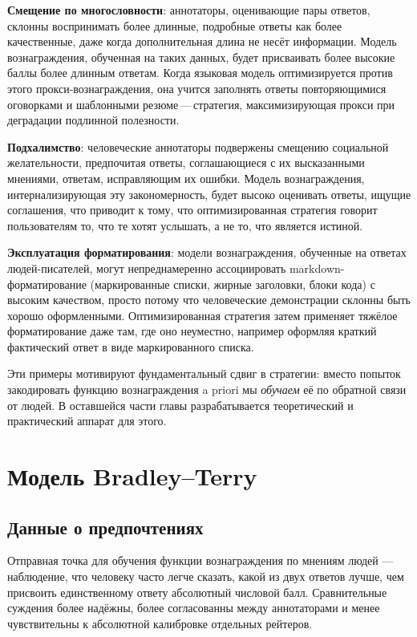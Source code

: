 \textbf{Смещение по многословности}: аннотаторы, оценивающие пары ответов, склонны воспринимать более длинные, подробные ответы как более качественные, даже когда дополнительная длина не несёт информации. Модель вознаграждения, обученная на таких данных, будет присваивать более высокие баллы более длинным ответам. Когда языковая модель оптимизируется против этого прокси-вознаграждения, она учится заполнять ответы повторяющимися оговорками и шаблонными резюме\,---\,стратегия, максимизирующая прокси при деградации подлинной полезности.

\textbf{Подхалимство}: человеческие аннотаторы подвержены смещению социальной желательности, предпочитая ответы, соглашающиеся с их высказанными мнениями, ответам, исправляющим их ошибки. Модель вознаграждения, интернализирующая эту закономерность, будет высоко оценивать ответы, ищущие соглашения, что приводит к тому, что оптимизированная стратегия говорит пользователям то, что те хотят услышать, а не то, что является истиной.

\textbf{Эксплуатация форматирования}: модели вознаграждения, обученные на ответах людей-писателей, могут непреднамеренно ассоциировать markdown-форматирование (маркированные списки, жирные заголовки, блоки кода) с высоким качеством, просто потому что человеческие демонстрации склонны быть хорошо оформленными. Оптимизированная стратегия затем применяет тяжёлое форматирование даже там, где оно неуместно, например оформляя краткий фактический ответ в виде маркированного списка.

Эти примеры мотивируют фундаментальный сдвиг в стратегии: вместо попыток закодировать функцию вознаграждения a priori мы \emph{обучаем} её по обратной связи от людей. В оставшейся части главы разрабатывается теоретический и практический аппарат для этого.

\section{Модель Bradley--Terry}
\label{sec:bradley-terry}

\subsection{Данные о предпочтениях}

Отправная точка для обучения функции вознаграждения по мнениям людей --- наблюдение, что человеку часто легче сказать, какой из двух ответов лучше, чем присвоить единственному ответу абсолютный числовой балл. Сравнительные суждения более надёжны, более согласованны между аннотаторами и менее чувствительны к абсолютной калибровке отдельных рейтеров.

